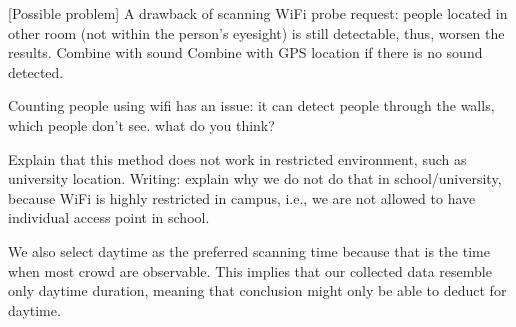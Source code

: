 [Possible problem] A drawback of scanning WiFi probe request: people located in other room (not within the person's eyesight) is still detectable, thus, worsen the results.
Combine with sound
Combine with GPS location if there is no sound detected.

Counting people using wifi has an issue: it can detect people through the walls, which people don't see. what do you think?

Explain that this method does not work in restricted environment, such as university location. Writing: explain why we do not do that in school/university, because WiFi is highly restricted in campus, i.e., we are not allowed to have individual access point in school.

We also select daytime as the preferred scanning time because that is the time when most crowd are observable. This implies that our collected data resemble only daytime duration, meaning that conclusion might only be able to deduct for daytime.


